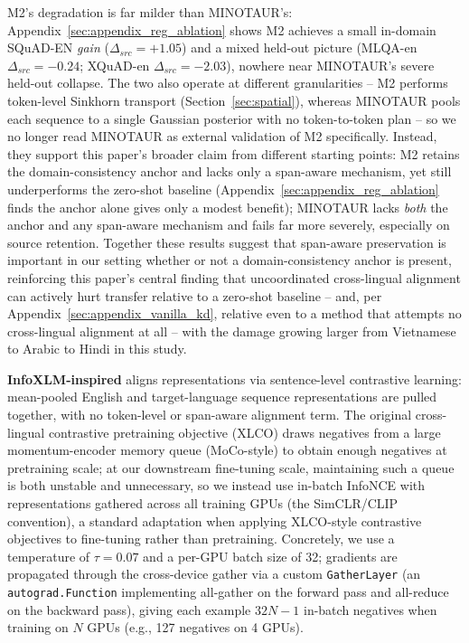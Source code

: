 \documentclass[11pt]{article}
\begin{document}
M2's degradation is far milder than MINOTAUR's: Appendix~\ref{sec:appendix_reg_ablation} shows M2 achieves a small in-domain SQuAD-EN \emph{gain} ($\Delta_{src}=+1.05$) and a mixed held-out picture (MLQA-en $\Delta_{src}=-0.24$; XQuAD-en $\Delta_{src}=-2.03$), nowhere near MINOTAUR's severe held-out collapse. The two also operate at different granularities -- M2 performs token-level Sinkhorn transport (Section~\ref{sec:spatial}), whereas MINOTAUR pools each sequence to a single Gaussian posterior with no token-to-token plan -- so we no longer read MINOTAUR as external validation of M2 specifically. Instead, they support this paper's broader claim from different starting points: M2 retains the domain-consistency anchor and lacks only a span-aware mechanism, yet still underperforms the zero-shot baseline (Appendix~\ref{sec:appendix_reg_ablation} finds the anchor alone gives only a modest benefit); MINOTAUR lacks \emph{both} the anchor and any span-aware mechanism and fails far more severely, especially on source retention. Together these results suggest that span-aware preservation is important in our setting whether or not a domain-consistency anchor is present, reinforcing this paper's central finding that uncoordinated cross-lingual alignment can actively hurt transfer relative to a zero-shot baseline -- and, per Appendix~\ref{sec:appendix_vanilla_kd}, relative even to a method that attempts no cross-lingual alignment at all -- with the damage growing larger from Vietnamese to Arabic to Hindi in this study.

\textbf{InfoXLM-inspired}
\label{sec:appendix_infoxlm}
\citep{chi-etal-2021-infoxlm} aligns representations via sentence-level contrastive learning: mean-pooled English and target-language sequence representations are pulled together, with no token-level or span-aware alignment term. The original cross-lingual contrastive pretraining objective (XLCO) draws negatives from a large momentum-encoder memory queue (MoCo-style) to obtain enough negatives at pretraining scale; at our downstream fine-tuning scale, maintaining such a queue is both unstable and unnecessary, so we instead use in-batch InfoNCE with representations gathered across all training GPUs (the SimCLR/CLIP convention), a standard adaptation when applying XLCO-style contrastive objectives to fine-tuning rather than pretraining. Concretely, we use a temperature of $\tau=0.07$ and a per-GPU batch size of 32; gradients are propagated through the cross-device gather via a custom \texttt{GatherLayer} (an \texttt{autograd.Function} implementing all-gather on the forward pass and all-reduce on the backward pass), giving each example $32N-1$ in-batch negatives when training on $N$ GPUs (e.g., 127 negatives on 4 GPUs).
\end{document}
